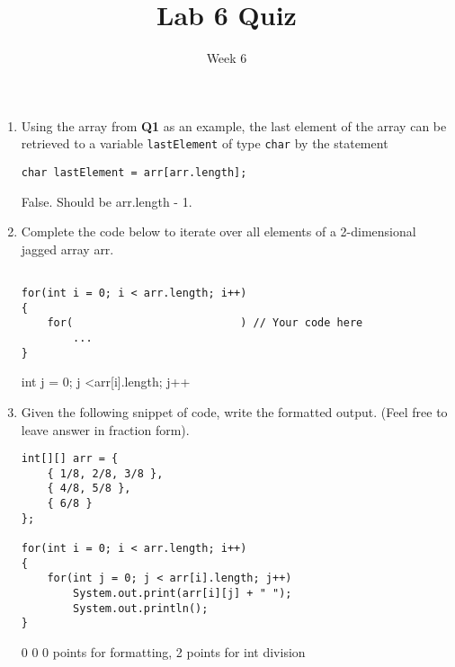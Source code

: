 \documentclass[12pt]{article}
\title{Lab 6 Quiz}
\date{Week 6}
\begin{document}
 

\Instructions

\begin{enumerate}
    
\item {} \tf Using the array from \textbf{Q1} as an example, the last element of the array can be retrieved to a variable \texttt{lastElement} of type \texttt{char} by the statement
\begin{lstlisting}
char lastElement = arr[arr.length];
\end{lstlisting}

\Ans False. Should be arr.length - 1.
\item {} Complete the code below to iterate over all elements of a 2-dimensional jagged array arr.

\begin{lstlisting}

for(int i = 0; i < arr.length; i++)
{
	for(                          ) // Your code here
        ...
}
\end{lstlisting}

\Ans int j = 0; j \textless arr[i].length; j++

\item {} Given the following snippet of code, write the formatted output. (Feel free to leave answer in fraction form).
\begin{lstlisting}
int[][] arr = {
	{ 1/8, 2/8, 3/8 },
	{ 4/8, 5/8 },
	{ 6/8 }
};

for(int i = 0; i < arr.length; i++)
{
	for(int j = 0; j < arr[i].length; j++)
		System.out.print(arr[i][j] + " ");
    	System.out.println();
}
\end{lstlisting}

\Ans {} 0 0  0   points for formatting, 2 points for int division
\clearpage
\ifdraft \clearpage \fi

\end{enumerate}   
\end{document}
